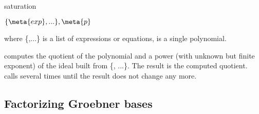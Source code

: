
\begin{Operator}{saturation}
\begin{Syntax}

\(\{\meta{exp}, ...\}, \meta{p}\)

\end{Syntax}
where \{,...\} is a list of
expressions or equations,   is a single polynomial.

 computes the quotient of the polynomial 
and a power (with unknown but finite exponent) of the ideal built from
\{, ...\}. The result is the computed quotient. 
calls  several times until the result does not change
any more.
\end{Operator}

\subsection{Factorizing Groebner bases}

